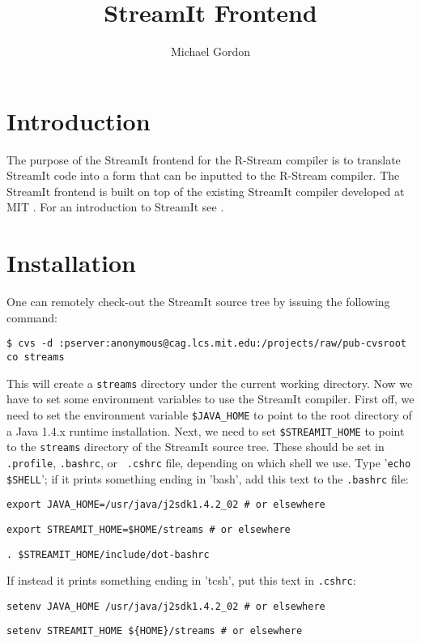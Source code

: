 \documentclass[10pt, letterpaper, onecolumn]{article}
\title{StreamIt Frontend}
\author{Michael Gordon}
\begin{document}
\newcommand{\mt}[1]{\mbox{\it #1}}

\date{}
\maketitle


\section{Introduction}
The purpose of the StreamIt frontend for the R-Stream compiler is to
translate StreamIt code into a form that can be inputted to the
R-Stream compiler.  The StreamIt frontend is built on top of the
existing StreamIt compiler developed at MIT
\cite{streamit-asplos}. For an introduction to StreamIt see
\cite{streamitspec}.

\section{Installation}
One can remotely check-out the StreamIt source tree by issuing the
following command:

\medskip
{\tt \$ cvs -d :pserver:anonymous@cag.lcs.mit.edu:/projects/raw/pub-cvsroot co
streams}
\medskip

This will create a {\tt streams} directory under the current working
directory.  Now we have to set some environment variables to use the
StreamIt compiler.  First off, we need to set the environment variable
{\tt \$JAVA\_HOME} to point to the root directory of a Java 1.4.x
runtime installation.  Next, we need to set {\tt \$STREAMIT\_HOME} to
point to the {\tt streams} directory of the StreamIt source tree.
These should be set in {\tt .profile}, {\tt .bashrc}, or {\tt
.cshrc} file, depending on which shell we use.  Type '{\tt echo
\$SHELL}'; if it prints something ending in 'bash', add this text to
the {\tt .bashrc} file:

\medskip
  {\tt export JAVA\_HOME=/usr/java/j2sdk1.4.2\_02 \# or elsewhere}

  {\tt export STREAMIT\_HOME=\$HOME/streams \# or elsewhere}

  {\tt . \$STREAMIT\_HOME/include/dot-bashrc}
\medskip


If instead it prints something ending in 'tcsh', put this text in
{\tt .cshrc}:

\medskip
  {\tt setenv JAVA\_HOME /usr/java/j2sdk1.4.2\_02 \# or elsewhere}

  {\tt setenv STREAMIT\_HOME \$\{HOME\}/streams \# or elsewhere}
\end{document}
